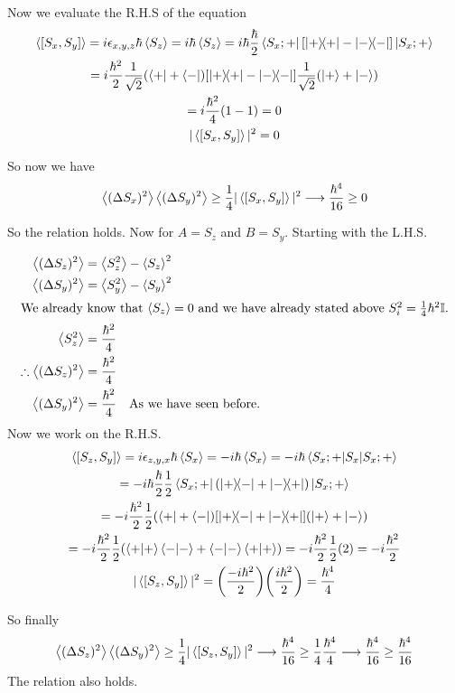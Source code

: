 Now we evaluate the R.H.S of the equation
\begin{gather*}
	\ev{\comm{S_x}{S_y}} = i\epsilon_{x,y,z} \hbar \ev{S_z} = i\hbar \ev{S_z} = i \hbar \frac{\hbar}{2} \bra{S_x;+}\qty[\op{+}{+} - \ketbra{-}]\ket{S_x;+ }\\
	=i\frac{\hbar^2}{2}  \frac{1}{\sqrt{2}} \qty(\bra + + \bra -) \qty[\op{+}{+} - \ketbra{-}]\frac{1}{\sqrt{2}} \qty(\ket + + \ket -)\\
	= i\frac{\hbar^2}{4} (1 - 1) = 0 \\
	|\ev{\comm{S_x}{S_y}}|^2 = 0
\end{gather*}

So now we have
\[
	\ev{(\Delta S_x)^2}\ev{(\Delta S_y)^2} \ge \frac{1}{4} |\ev{\comm{S_x}{S_y}}|^2 \longrightarrow \frac{\hbar^4}{16} \ge 0
\]

So the relation holds. Now for $A = S_z$ and $B = S_y$. Starting with the L.H.S.

\begin{align*}
	\ev{(\Delta S_z)^2}            & = \ev{S_z^2} - \ev{S_z}^2                        \\
	\ev{(\Delta S_y)^2}            & = \ev{S_y^2} - \ev{S_y}^2                        \\
	\intertext{We already know that $\ev{S_z} = 0$ and we have already stated above $S_i^2 = \frac14 \hbar^2\mathbb{I}$.}
	\ev{S_z^2}                     & = \frac{\hbar^2}{4}                              \\
	\therefore \ev{(\Delta S_z)^2} & = \frac{\hbar^2}{4}                              \\
	\ev{(\Delta S_y)^2}            & = \frac{\hbar^2}{4} \qq{As we have seen before.} \\
\end{align*}
Now we work on the R.H.S.
\begin{gather*}
	\ev{\comm{S_z}{S_y}} = i\epsilon_{z,y,x} \hbar \ev{S_x} = -i\hbar \ev{S_x}= -i \hbar \ev{S_x}{S_x;+}\\
	= -i\hbar\frac{\hbar}{2}\frac12 \bra{S_x;+}\qty(\op{+}{-} + \op{-}{+})\ket{S_x;+ }\\
	= -i\frac{\hbar^2}{2} \frac12  \qty(\bra + + \bra -) \qty[\op{+}{-} + \ketbra{-}{+}] \qty(\ket + + \ket -)\\
	= -i\frac{\hbar^2}{2} \frac12 (\braket{+} \braket{-} + \braket{-} \braket{+}) = -i \frac{\hbar^2}{2} \frac12 (2) = -i\frac{\hbar^2}{2}\\
	|\ev{\comm{S_z}{S_y}}|^2 = \qty(\frac{-i\hbar^2}{2})\qty(\frac{i\hbar^2}{2}) = \frac{\hbar^4}{4}
\end{gather*}


So finally
\[
	\ev{(\Delta S_z)^2}\ev{(\Delta S_y)^2} \ge \frac{1}{4} |\ev{\comm{S_z}{S_y}}|^2 \longrightarrow \frac{\hbar^4}{16} \ge \frac14 \frac{\hbar^4}{4} \longrightarrow \frac{\hbar^4}{16} \ge \frac{\hbar^4}{16}
\]
The relation also holds.
